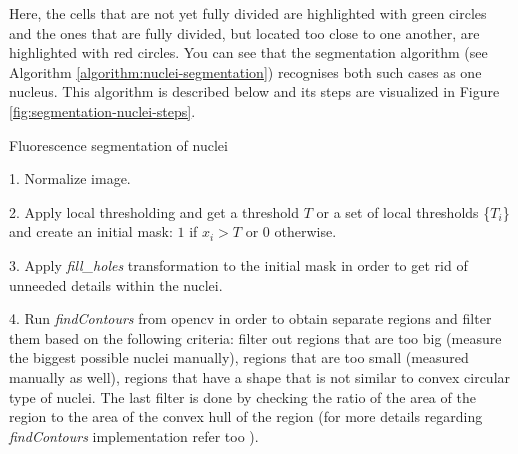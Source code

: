 Here, the cells that are not yet fully divided are highlighted with green circles and the ones that are fully divided, but located too close to one another, are highlighted with red circles. You can see that the segmentation algorithm (see Algorithm \ref{algorithm:nuclei-segmentation}) recognises both such cases as one nucleus. This algorithm is described below and its steps are visualized in Figure \ref{fig:segmentation-nuclei-steps}.
\begin{algorithm}
    \caption{Fluorescence segmentation of nuclei}
    \begin{algorithmic}
    \item 1. Normalize image.
    \item 2. Apply local thresholding and get a threshold $T$ or a set of local thresholds \{$T_i$\} and create an initial mask: $1$ if $x_i > T$ or $0$ otherwise.
    \item 3. Apply \textit{fill\_holes} transformation to the initial mask in order to get rid of unneeded details within the nuclei.
    \item 4. Run \textit{findContours} from opencv in order to obtain separate regions and filter them based on the following criteria: filter out regions that are too big (measure the biggest possible nuclei manually), regions that are too small (measured manually as well), regions that have a shape that is not similar to convex circular type of nuclei. The last filter is done by checking the ratio of the area of the region to the area of the convex hull of the region (for more details regarding \textit{findContours} implementation refer too \cite{Suzuki_1985}).
    \end{algorithmic}
    \label{algorithm:nuclei-segmentation}
\end{algorithm}


